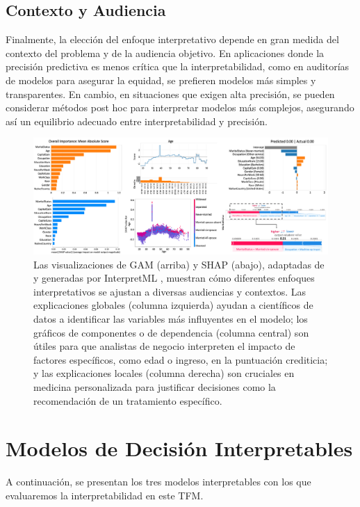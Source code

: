 \subsection{Contexto y Audiencia}

Finalmente, la elección del enfoque interpretativo depende en gran medida del contexto del problema y de la audiencia objetivo. En aplicaciones donde la precisión predictiva es menos crítica que la interpretabilidad, como en auditorías de modelos para asegurar la equidad, se prefieren modelos más simples y transparentes. En cambio, en situaciones que exigen alta precisión, se pueden considerar métodos post hoc para interpretar modelos más complejos, asegurando así un equilibrio adecuado entre interpretabilidad y precisión.

\begin{figure}[H]
    \centering
    \includegraphics[width=1\textwidth]{include/contexto.PNG}
    \caption{Las visualizaciones de GAM (arriba) y SHAP (abajo), adaptadas de \cite{Kaur-2020} y generadas por InterpretML \cite{nori2019interpretml}, muestran cómo diferentes enfoques interpretativos se ajustan a diversas audiencias y contextos. Las explicaciones globales (columna izquierda) ayudan a científicos de datos a identificar las variables más influyentes en el modelo; los gráficos de componentes o de dependencia (columna central) son útiles para que analistas de negocio interpreten el impacto de factores específicos, como edad o ingreso, en la puntuación crediticia; y las explicaciones locales (columna derecha) son cruciales en medicina personalizada para justificar decisiones como la recomendación de un tratamiento específico.}
    \label{fig:contexto_audiencia}
\end{figure}

\section{Modelos de Decisión Interpretables}

A continuación, se presentan los tres modelos interpretables con los que evaluaremos la interpretabilidad en este TFM.

